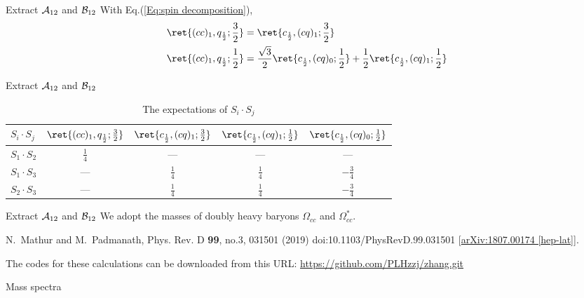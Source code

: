 \begin{frame}{Extract $\mathcal{A}_{12}$ and $\mathcal{B}_{12}$}
    With Eq.(\ref{Eq:spin decomposition}),
    \begin{align}
        \ret{(cc)_{1},q_{\frac{1}{2}};\frac{3}{2}} 
        &= \ret{c_{\frac{1}{2}},(cq)_{1};\frac{3}{2}} \\
        \ret{(cc)_{1},q_{\frac{1}{2}};\frac{1}{2}} 
        &= \frac{\sqrt{3}}{2}\ret{c_{\frac{1}{2}},(cq)_{0};\frac{1}{2}} + \frac{1}{2}\ret{c_{\frac{1}{2}},(cq)_{1};\frac{1}{2}}
    \end{align}
    
    
\end{frame}
\begin{frame}{Extract $\mathcal{A}_{12}$ and $\mathcal{B}_{12}$}
    \begin{table}[htbp]
        \begin{tabular}{@{}l|c|c|c|c@{}}
            \toprule[1pt]
            $S_{i}\cdot S_{j}$ & $\ret{(cc)_{1},q_{\frac{1}{2}};\frac{3}{2}}$ & $\ret{c_{\frac{1}{2}},(cq)_{1};\frac{3}{2}}$   & $\ret{c_{\frac{1}{2}},(cq)_{1};\frac{1}{2}}$ & $\ret{c_{\frac{1}{2}},(cq)_{0};\frac{1}{2}}$               \\\midrule
            $S_{1}\cdot S_{2}$                       & $\frac{1}{4}$        & ---  & --- & ---\\[10pt]
            $S_{1}\cdot S_{3}$                       & ---        & $\frac{1}{4}$ & $\frac{1}{4}$ & $-\frac{3}{4}$\\[10pt]
            $S_{2}\cdot S_{3}$                       & ---        & $\frac{1}{4}$ & $\frac{1}{4}$ & $-\frac{3}{4}$
            \\\bottomrule[1pt]
        \end{tabular}
        \caption{The expectations of $S_{i}\cdot S_{j}$}
    \end{table}
\end{frame}
\begin{frame}{Extract $\mathcal{A}_{12}$  and $\mathcal{B}_{12}$}
    We adopt the masses of doubly heavy baryons $\Omega_{cc}$ and $\Omega_{cc}^{*}$.
    
    \begin{table}[htbp]
    \caption{Parameters}
    \end{table}
    \begin{thebibliography}
        \beamertemplatetextbibitems
        N.~Mathur and M.~Padmanath,
        Phys. Rev. D \textbf{99}, no.3, 031501 (2019)
        doi:10.1103/PhysRevD.99.031501
        [\href{https://arxiv.org/abs/1807.00174}{arXiv:1807.00174 [hep-lat]}].
    \end{thebibliography}
    The codes for these calculations can be downloaded from this URL: \url{https://github.com/PLHzzj/zhang.git}
\end{frame}
\begin{frame}{Mass spectra}
    \begin{table}[htbp]
    \caption{Mass spectra (unit: MeV)}
    \end{table}
\end{frame}









